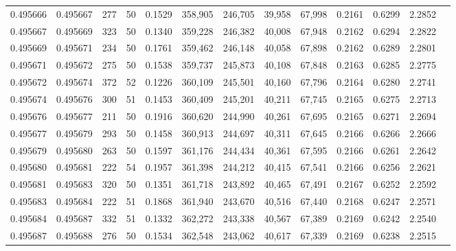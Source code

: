 \begin{tabular}{rrrrrrrrrrrrr}
0.495666 & 0.495667 &   277 &  50 &                                     0.1529 & 358,905 & 246,705 &  39,958 &  67,998 & 0.2161 & 0.6299 & 2.2852 \\
0.495667 & 0.495669 &   323 &  50 &                                     0.1340 & 359,228 & 246,382 &  40,008 &  67,948 & 0.2162 & 0.6294 & 2.2822 \\
0.495669 & 0.495671 &   234 &  50 &                                     0.1761 & 359,462 & 246,148 &  40,058 &  67,898 & 0.2162 & 0.6289 & 2.2801 \\
0.495671 & 0.495672 &   275 &  50 &                                     0.1538 & 359,737 & 245,873 &  40,108 &  67,848 & 0.2163 & 0.6285 & 2.2775 \\
0.495672 & 0.495674 &   372 &  52 &                                     0.1226 & 360,109 & 245,501 &  40,160 &  67,796 & 0.2164 & 0.6280 & 2.2741 \\
0.495674 & 0.495676 &   300 &  51 &                                     0.1453 & 360,409 & 245,201 &  40,211 &  67,745 & 0.2165 & 0.6275 & 2.2713 \\
0.495676 & 0.495677 &   211 &  50 &                                     0.1916 & 360,620 & 244,990 &  40,261 &  67,695 & 0.2165 & 0.6271 & 2.2694 \\
0.495677 & 0.495679 &   293 &  50 &                                     0.1458 & 360,913 & 244,697 &  40,311 &  67,645 & 0.2166 & 0.6266 & 2.2666 \\
0.495679 & 0.495680 &   263 &  50 &                                     0.1597 & 361,176 & 244,434 &  40,361 &  67,595 & 0.2166 & 0.6261 & 2.2642 \\
0.495680 & 0.495681 &   222 &  54 &                                     0.1957 & 361,398 & 244,212 &  40,415 &  67,541 & 0.2166 & 0.6256 & 2.2621 \\
0.495681 & 0.495683 &   320 &  50 &                                     0.1351 & 361,718 & 243,892 &  40,465 &  67,491 & 0.2167 & 0.6252 & 2.2592 \\
0.495683 & 0.495684 &   222 &  51 &                                     0.1868 & 361,940 & 243,670 &  40,516 &  67,440 & 0.2168 & 0.6247 & 2.2571 \\
0.495684 & 0.495687 &   332 &  51 &                                     0.1332 & 362,272 & 243,338 &  40,567 &  67,389 & 0.2169 & 0.6242 & 2.2540 \\
0.495687 & 0.495688 &   276 &  50 &                                     0.1534 & 362,548 & 243,062 &  40,617 &  67,339 & 0.2169 & 0.6238 & 2.2515 \\

\end{tabular}
